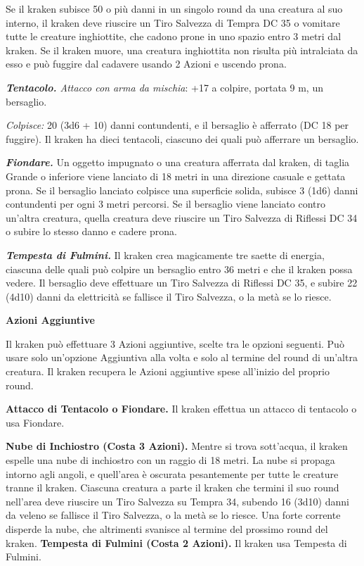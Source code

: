 \begin{multicols}{2}
{Se il kraken subisce 50 o più danni in un singolo round da una creatura al suo interno, il kraken deve riuscire un Tiro Salvezza di Tempra DC 35 o vomitare tutte le creature inghiottite, che cadono prone in uno spazio entro 3 metri dal kraken. Se il kraken muore, una creatura inghiottita non risulta più intralciata da esso e può fuggire dal cadavere usando 2 Azioni e uscendo prona.

\emph{\textbf{Tentacolo.} Attacco con arma da mischia}: +17 a colpire, portata 9 m, un bersaglio.

\emph{Colpisce:} 20 (3d6 + 10) danni contundenti, e il bersaglio è afferrato (DC 18 per fuggire). Il kraken ha dieci tentacoli, ciascuno dei quali può afferrare un bersaglio.

\emph{\textbf{Fiondare.}} Un oggetto impugnato o una creatura afferrata dal kraken, di taglia Grande o inferiore viene lanciato di 18 metri in una direzione casuale e gettata prona. Se il bersaglio lanciato colpisce una superficie solida, subisce 3 (1d6) danni contundenti per ogni 3 metri percorsi. Se il bersaglio viene lanciato contro un'altra creatura, quella creatura deve riuscire un Tiro Salvezza di Riflessi DC 34 o subire lo stesso danno e cadere prona.

\emph{\textbf{Tempesta di Fulmini.}} Il kraken crea magicamente tre saette di energia, ciascuna delle quali può colpire un bersaglio entro 36 metri e che il kraken possa vedere. Il bersaglio deve effettuare un Tiro Salvezza di Riflessi DC 35, e subire 22 (4d10) danni da elettricità se fallisce il Tiro Salvezza, o la metà se lo riesce.

\textbf{Azioni Aggiuntive}

Il kraken può effettuare 3 Azioni aggiuntive, scelte tra le opzioni seguenti. Può usare solo un'opzione Aggiuntiva alla volta e solo al termine del round di un'altra creatura. Il kraken recupera le Azioni aggiuntive spese all'inizio del proprio round.

\textbf{Attacco di Tentacolo o Fiondare.} Il kraken effettua un attacco di tentacolo o usa Fiondare.

\textbf{Nube di Inchiostro (Costa 3 Azioni).} Mentre si trova sott'acqua, il kraken espelle una nube di inchiostro con un raggio di 18 metri. La nube si propaga intorno agli angoli, e quell'area è oscurata pesantemente per tutte le creature tranne il kraken. Ciascuna creatura a parte il kraken che termini il suo round nell'area deve riuscire un Tiro Salvezza su Tempra 34, subendo 16 (3d10) danni da veleno se fallisce il Tiro Salvezza, o la metà se lo riesce. Una forte corrente disperde la nube, che altrimenti svanisce al termine del prossimo round del kraken. \textbf{Tempesta di Fulmini (Costa 2 Azioni).} Il kraken usa Tempesta di Fulmini.

}
\end{multicols}
